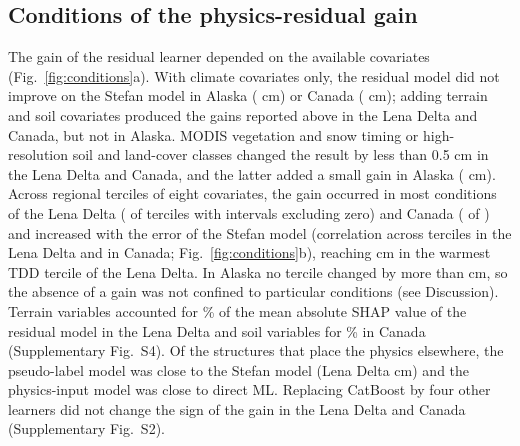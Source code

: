 \subsection{Conditions of the physics-residual gain}
The gain of the residual learner depended on the available covariates (Fig.~\ref{fig:conditions}a). With climate covariates only, the residual model did not improve on the Stefan model in Alaska (\ndfeatAkFclim{} cm) or Canada (\ndfeatCaFclim{} cm); adding terrain and soil covariates produced the gains reported above in the Lena Delta and Canada, but not in Alaska. MODIS vegetation and snow timing or high-resolution soil and land-cover classes changed the result by less than 0.5 cm in the Lena Delta and Canada, and the latter added a small gain in Alaska (\ndfeatAkFhires{} cm). Across regional terciles of eight covariates, the gain occurred in most conditions of the Lena Delta (\ngcLesig{} of \ngcLecells{} terciles with intervals excluding zero) and Canada (\ngcCasig{} of \ngcCacells) and increased with the error of the Stefan model (correlation across terciles \ngcLecorr{} in the Lena Delta and \ngcCacorr{} in Canada; Fig.~\ref{fig:conditions}b), reaching \ndtddLewarm{} cm in the warmest TDD tercile of the Lena Delta. In Alaska no tercile changed by more than \ngcAkmaxabs{} cm, so the absence of a gain was not confined to particular conditions (see Discussion). Terrain variables accounted for \nshapLeResTerrain\% of the mean absolute SHAP value of the residual model in the Lena Delta and soil variables for \nshapCaResSoil\% in Canada (Supplementary Fig.~S4). Of the structures that place the physics elsewhere, the pseudo-label model was close to the Stefan model (Lena Delta \ndrefLeblkDo{} cm) and the physics-input model was close to direct ML. Replacing CatBoost by four other learners did not change the sign of the gain in the Lena Delta and Canada (Supplementary Fig.~S2).


